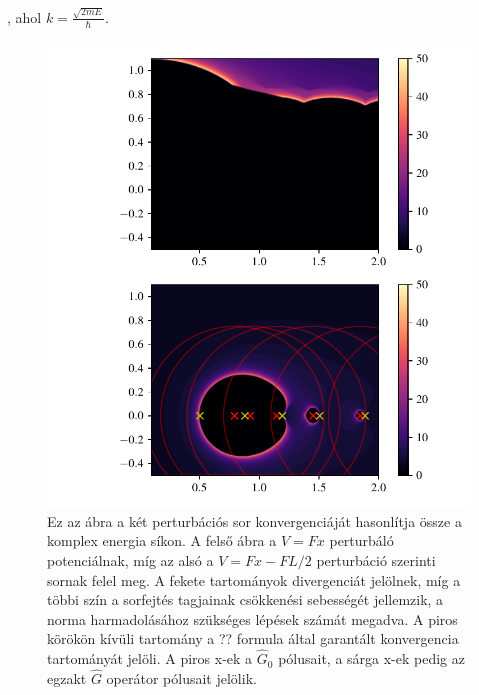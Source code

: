 , ahol $k = \frac{\sqrt{2mE}}{\hbar}$.
\begin{figure}[H]
	\centering
	\includegraphics[scale=1]{./figs/convergence3.pdf}
	\caption[Green-függvény perturbációs sorának konvergenciája]{Ez az ábra a két perturbációs sor konvergenciáját hasonlítja össze a komplex energia síkon. A felső ábra a $V=Fx$ perturbáló potenciálnak, míg az alsó a $V = Fx-FL/2$ perturbáció szerinti sornak felel meg. A fekete tartományok divergenciát jelölnek, míg a többi szín a sorfejtés tagjainak csökkenési sebességét jellemzik, a norma harmadolásához szükséges lépések számát megadva. A piros körökön kívüli tartomány a ?? formula által garantált konvergencia tartományát jelöli. A piros x-ek a $\hat{G}_0$ pólusait, a sárga x-ek pedig az egzakt $\hat{G}$ operátor pólusait jelölik.}
\end{figure}






